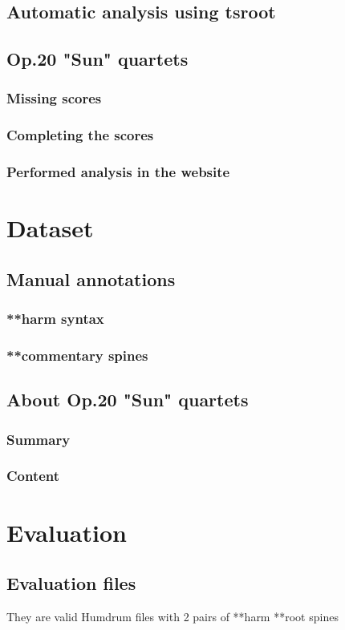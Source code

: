   \subsection{Automatic analysis using tsroot}
  \subsection{Op.20 "Sun" quartets}
    \subsubsection{Missing scores}
    \subsubsection{Completing the scores}
    \subsubsection{Performed analysis in the website}
\section{Dataset}
	\subsection{Manual annotations}
		\subsubsection{**harm syntax}
		\subsubsection{**commentary spines}
	\subsection{About Op.20 "Sun" quartets}
		\subsubsection{Summary}
		\subsubsection{Content}
\section{Evaluation}
  \subsection{Evaluation files}
		They are valid Humdrum files with 2 pairs of **harm **root spines
